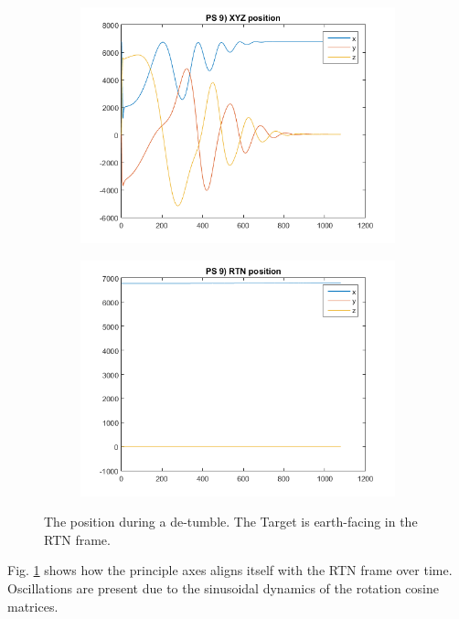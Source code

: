 \documentclass[12pt, letterpaper]{article}
\begin{document}
\begin{figure}[H]
	\centering
	\begin{subfigure}[b]{0.49\textwidth}
	\includegraphics[width=\textwidth,trim={10mm, 5mm, 13mm, 3mm},clip]{ps9_02}
	\end{subfigure}
	\begin{subfigure}[b]{0.49\textwidth}
		\includegraphics[width=\textwidth,trim={10mm, 5mm, 13mm, 3mm},clip]{ps9_03}
	\end{subfigure}
	\caption{The position during a de-tumble. The Target is earth-facing in the RTN frame.}
	\label{(9:pos)}
\end{figure}

Fig. \ref{(9:pos)} shows how the principle axes aligns itself with the RTN frame over time. Oscillations are present due to the sinusoidal dynamics of the rotation cosine matrices.
\end{document}
